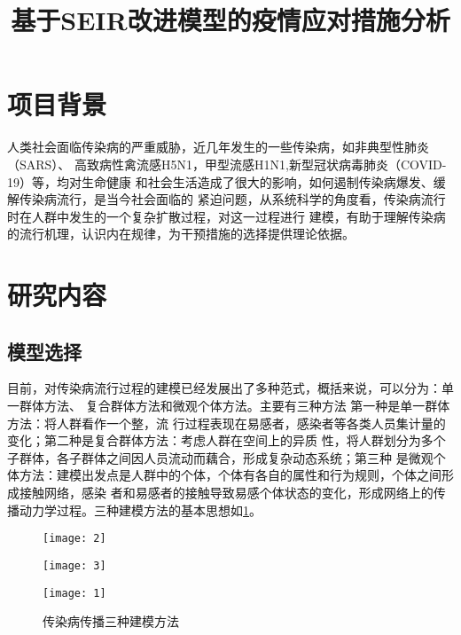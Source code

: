 \documentclass[withoutpreface,bwprint]{cumcmthesis}
\title{基于SEIR改进模型的疫情应对措施分析}
\begin{document}
\maketitle

\section{项目背景}
人类社会面临传染病的严重威胁，近几年发生的一些传染病，如非典型性肺炎（SARS）、
高致病性禽流感H5N1，甲型流感H1N1,新型冠状病毒肺炎（COVID-19）等，均对生命健康
和社会生活造成了很大的影响，如何遏制传染病爆发、缓解传染病流行，是当今社会面临的
紧迫问题，从系统科学的角度看，传染病流行时在人群中发生的一个复杂扩散过程，对这一过程进行
建模，有助于理解传染病的流行机理，认识内在规律，为干预措施的选择提供理论依据。

\section{研究内容}
\subsection{模型选择}
目前，对传染病流行过程的建模已经发展出了多种范式，概括来说，可以分为：单一群体方法、
复合群体方法和微观个体方法。主要有三种方法 第一种是单一群体方法：将人群看作一个整，流
行过程表现在易感者，感染者等各类人员集计量的变化；第二种是复合群体方法：考虑人群在空间上的异质
性，将人群划分为多个子群体，各子群体之间因人员流动而藕合，形成复杂动态系统；第三种
是微观个体方法：建模出发点是人群中的个体，个体有各自的属性和行为规则，个体之间形成接触网络，感染
者和易感者的接触导致易感个体状态的变化，形成网络上的传播动力学过程。三种建模方法的基本思想如\cref{fig:1}。
\begin{figure}[H]
    \centering
    \begin{minipage}[c]{0.3\textwidth}
        \centering
        \texttt{[image: 2]}
        \label{fig:1.1}
    \end{minipage}
    \begin{minipage}[c]{0.3\textwidth}
        \centering
        \texttt{[image: 3]}
        \label{fig:1.2}
    \end{minipage}
    \begin{minipage}[c]{0.3\textwidth}
        \centering
        \texttt{[image: 1]}
        \label{fig:1.3}
    \end{minipage}
    \caption{传染病传播三种建模方法}
    \label{fig:1}
\end{figure}
\end{document}
